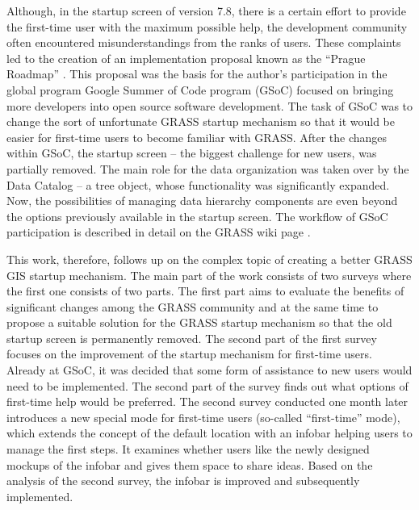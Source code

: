 \documentclass[a4paper,10pt,twoside]{article}
\begin{document}
Although, in the startup screen of version 7.8, there is a certain
effort to provide the first-time user with the maximum possible help,
the development community often encountered misunderstandings from the
ranks of users. These complaints led to the creation of an
implementation proposal known as the ``Prague Roadmap'' \cite{roadmap}. 
This proposal was
the basis for the author's participation in the global program Google
Summer of Code program (GSoC) focused on bringing more
developers into open source software development. The task of GSoC was
to change the sort of unfortunate GRASS startup mechanism so that it
would be easier for first-time users to become familiar with
GRASS. After the changes within GSoC, the startup screen -- the
biggest challenge for new users, was partially removed. The main role for
the data organization was taken over by the Data Catalog -- a tree
object, whose functionality was significantly expanded. Now, the
possibilities of managing data hierarchy components are even beyond
the options previously available in the startup screen.
The workflow of GSoC participation is described in detail on the 
GRASS wiki page \cite{gsoc}. 

This work, therefore, follows up on the complex topic of creating a
better GRASS GIS startup mechanism. The main part of the work consists
of two surveys where the first one consists of two parts. The first part aims 
to evaluate the benefits of significant changes
among the GRASS community and at the same time to propose a suitable
solution for the GRASS startup mechanism so that
the old startup screen is permanently removed. The second part of the
first survey focuses on the improvement of the startup mechanism for
first-time users. Already at GSoC, it was decided that some form of
assistance to new users would need to be implemented. The second part
of the survey finds out what options of first-time help would be
preferred. The second survey conducted one month later introduces a
new special mode for first-time users (so-called ``first-time'' mode), which
extends the concept of the default location with an infobar helping
users to manage the first steps. It examines whether users like the
newly designed mockups of the infobar and gives them space to share
ideas. Based on the analysis of the second survey, the infobar is
improved and subsequently implemented.
\end{document}
